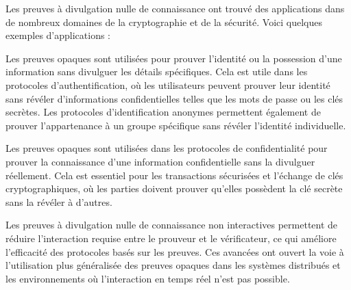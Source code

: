 Les preuves à divulgation nulle de connaissance ont trouvé des applications dans de nombreux
domaines de la cryptographie et de la sécurité. Voici quelques exemples d'applications :

Les preuves opaques sont utilisées pour prouver l'identité ou la possession d'une information sans
divulguer les détails spécifiques.
Cela est utile dans les protocoles d'authentification, où les utilisateurs peuvent prouver leur
identité sans révéler d'informations confidentielles telles que les mots de passe ou les clés secrètes.
Les protocoles d'identification anonymes permettent également de prouver l'appartenance à un groupe
spécifique sans révéler l'identité individuelle.

Les preuves opaques sont utilisées dans les protocoles de confidentialité pour prouver la
connaissance d'une information confidentielle sans la divulguer réellement.
Cela est essentiel pour les transactions sécurisées et l'échange de clés cryptographiques, où les
parties doivent prouver qu'elles possèdent la clé secrète sans la révéler à d'autres.

Les preuves à divulgation nulle de connaissance non interactives permettent de réduire l'interaction
requise entre le prouveur et le vérificateur, ce qui améliore l'efficacité des protocoles basés sur
les preuves.
Ces avancées ont ouvert la voie à l'utilisation plus généralisée des preuves opaques dans les
systèmes distribués et les environnements où l'interaction en temps réel n'est pas possible.



